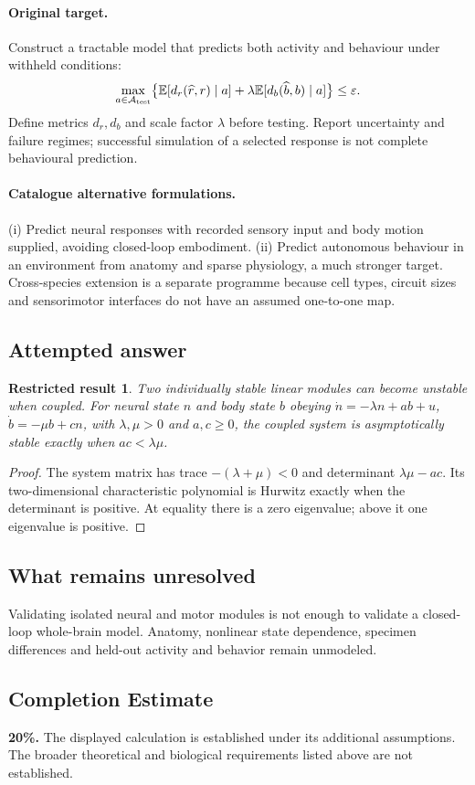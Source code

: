\documentclass[11pt]{article}
\newcommand{\E}{\mathbb E}
\providecommand{\E}{\mathbb E}
\newtheorem{attemptresult}{Restricted result}[section]
\begin{document}
\paragraph{Original target.}
Construct a tractable model that predicts both activity and behaviour under withheld conditions:
\[
\max_{a\in\mathcal A_{\rm test}}\bigl\{\E[d_r(\widehat r,r)\mid a]+\lambda\E[d_b(\widehat b,b)\mid a]\bigr\}\leq\varepsilon.
\]
Define metrics $d_r,d_b$ and scale factor $\lambda$ before testing. Report uncertainty and failure regimes; successful simulation of a selected response is not complete behavioural prediction.
\paragraph{Catalogue alternative formulations.}
(i) Predict neural responses with recorded sensory input and body motion supplied, avoiding closed-loop embodiment. (ii) Predict autonomous behaviour in an environment from anatomy and sparse physiology, a much stronger target. Cross-species extension is a separate programme because cell types, circuit sizes and sensorimotor interfaces do not have an assumed one-to-one map.
\subsection{Attempted answer}
\begin{attemptresult}
Two individually stable linear modules can become unstable when coupled. For neural state $n$ and body state $b$ obeying $\dot n=-\lambda n+ab+u$, $\dot b=-\mu b+cn$, with $\lambda,\mu>0$ and $a,c\geq0$, the coupled system is asymptotically stable exactly when $ac<\lambda\mu$.
\end{attemptresult}
\begin{proof}
The system matrix has trace $-(\lambda+\mu)<0$ and determinant $\lambda\mu-ac$. Its two-dimensional characteristic polynomial is Hurwitz exactly when the determinant is positive. At equality there is a zero eigenvalue; above it one eigenvalue is positive.
\end{proof}
\subsection{What remains unresolved}
Validating isolated neural and motor modules is not enough to validate a closed-loop whole-brain model. Anatomy, nonlinear state dependence, specimen differences and held-out activity and behavior remain unmodeled.
\subsection{Completion Estimate}
\textbf{20\%.} The displayed calculation is established under its additional assumptions. The broader theoretical and biological requirements listed above are not established.
\end{document}
